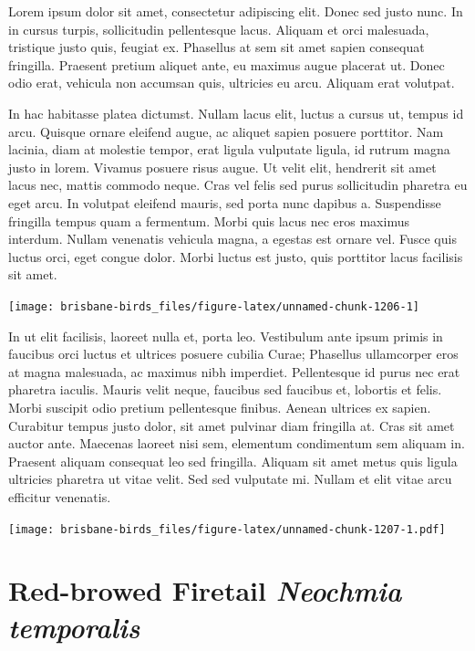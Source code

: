 \documentclass[]{book}
\let\origfigure\figure
\let\endorigfigure\endfigure
\renewenvironment{figure}[1][2] {
  \expandafter\origfigure\expandafter[H]
} {
  \endorigfigure
}
\begin{document}
Lorem ipsum dolor sit amet, consectetur adipiscing elit. Donec sed justo
nunc. In in cursus turpis, sollicitudin pellentesque lacus. Aliquam et
orci malesuada, tristique justo quis, feugiat ex. Phasellus at sem sit
amet sapien consequat fringilla. Praesent pretium aliquet ante, eu
maximus augue placerat ut. Donec odio erat, vehicula non accumsan quis,
ultricies eu arcu. Aliquam erat volutpat.

In hac habitasse platea dictumst. Nullam lacus elit, luctus a cursus ut,
tempus id arcu. Quisque ornare eleifend augue, ac aliquet sapien posuere
porttitor. Nam lacinia, diam at molestie tempor, erat ligula vulputate
ligula, id rutrum magna justo in lorem. Vivamus posuere risus augue. Ut
velit elit, hendrerit sit amet lacus nec, mattis commodo neque. Cras vel
felis sed purus sollicitudin pharetra eu eget arcu. In volutpat eleifend
mauris, sed porta nunc dapibus a. Suspendisse fringilla tempus quam a
fermentum. Morbi quis lacus nec eros maximus interdum. Nullam venenatis
vehicula magna, a egestas est ornare vel. Fusce quis luctus orci, eget
congue dolor. Morbi luctus est justo, quis porttitor lacus facilisis sit
amet.

\begin{figure}
\texttt{[image: brisbane-birds\_files/figure-latex/unnamed-chunk-1206-1]} \caption{insert figure caption}\label{fig:unnamed-chunk-1206}
\end{figure}

In ut elit facilisis, laoreet nulla et, porta leo. Vestibulum ante ipsum
primis in faucibus orci luctus et ultrices posuere cubilia Curae;
Phasellus ullamcorper eros at magna malesuada, ac maximus nibh
imperdiet. Pellentesque id purus nec erat pharetra iaculis. Mauris velit
neque, faucibus sed faucibus et, lobortis et felis. Morbi suscipit odio
pretium pellentesque finibus. Aenean ultrices ex sapien. Curabitur
tempus justo dolor, sit amet pulvinar diam fringilla at. Cras sit amet
auctor ante. Maecenas laoreet nisi sem, elementum condimentum sem
aliquam in. Praesent aliquam consequat leo sed fringilla. Aliquam sit
amet metus quis ligula ultricies pharetra ut vitae velit. Sed sed
vulputate mi. Nullam et elit vitae arcu efficitur venenatis.

\begin{figure}
\centering
\texttt{[image: brisbane-birds\_files/figure-latex/unnamed-chunk-1207-1.pdf]}
\caption{\label{fig:unnamed-chunk-1207}insert figure caption}
\end{figure}

\section{\texorpdfstring{Red-browed Firetail \emph{Neochmia
temporalis}}{Red-browed Firetail Neochmia temporalis}}\label{red-browed-firetail-neochmia-temporalis}
\end{document}
